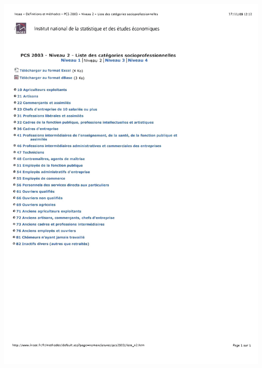 \documentclass{book}
\begin{document}
\includegraphics[scale=.3]{codesIPC_3.png}
\newpage
\end{document}
